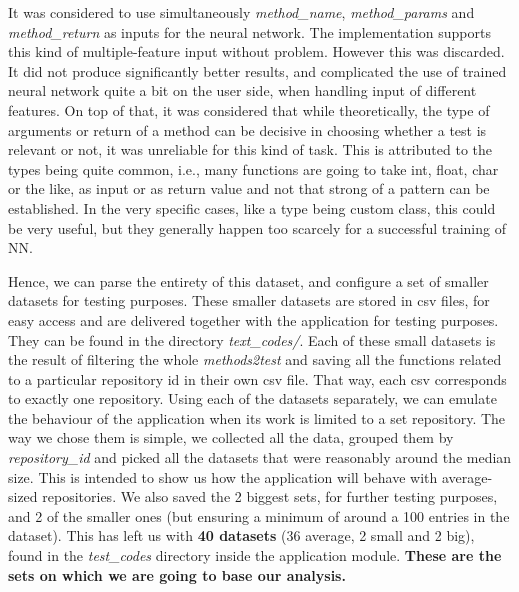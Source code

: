 \documentclass[a4paper, 11pt]{report}
\begin{document}
    \begin{tcolorbox}[title=Failed Approach: Using multiple inputs simultaneously , colback=white,colframe=red!60!black]
    It was considered to use simultaneously \textit{method\_name}, \textit{method\_params} and \textit{method\_return} as inputs for the neural network. The implementation supports this kind of multiple-feature input without problem. However this was discarded. It did not produce significantly better results, and complicated the use of trained neural network quite a bit on the user side, when handling input of different features. On top of that, it was considered that while theoretically, the type of arguments or return of a method can be decisive in choosing whether a test is relevant or not, it was unreliable for this kind of task. This is attributed to the types being quite common, i.e., many functions are going to take int, float, char or the like, as input or as return value and not that strong of a pattern can be established. In the very specific cases, like a type being custom class, this could be very useful, but they generally happen too scarcely for a successful training of NN.
    \end{tcolorbox}
Hence, we can parse the entirety of this dataset, and configure a set of smaller datasets for testing purposes. These smaller datasets are stored in csv files, for easy access and are delivered together with the application for testing purposes. They can be found in the directory \textit{text\_codes/}. Each of these small datasets is the result of filtering the whole \textit{methods2test} and saving all the functions related to a particular repository id in their own csv file. That way, each csv corresponds to exactly one repository. Using each of the datasets separately, we can emulate the behaviour of the application when its work is limited to a set repository. The way we chose them is simple, we collected all the data, grouped them by \textit{repository\_id} and picked all the datasets that were reasonably around the median size. This is intended to show us how the application will behave with average-sized repositories. We also saved the 2 biggest sets, for further testing purposes, and 2 of the smaller ones (but ensuring a minimum of around a 100 entries in the dataset). This has left us with \textbf{40 datasets} (36 average, 2 small and 2 big), found in the \textit{test\_codes} directory inside the application module. \textbf{These are the sets on which we are going to base our analysis.}
\end{document}
